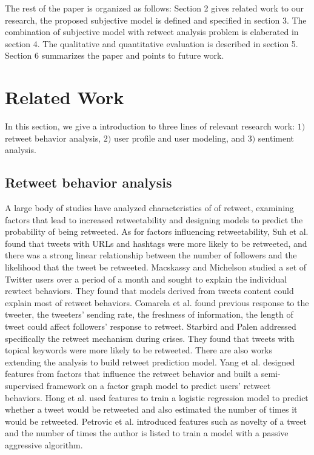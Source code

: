 \documentclass{acm_proc_article-sp}
\begin{document}
The rest of the paper is organized as follows: Section 2 gives related work to our research, the proposed subjective model is defined and specified in section 3. The combination of subjective model with retweet analysis problem is elaberated in section 4. The qualitative and quantitative evaluation is 
described in section 5. Section 6 summarizes the paper and points to future work.
\section{Related Work}
In this section, we give a introduction to three lines of relevant research work: $ 1) $ retweet behavior analysis, $ 2) $ user profile and user modeling, and $  3)$ sentiment analysis. 
\subsection{Retweet behavior analysis}
A large body of studies have analyzed characteristics of of retweet, examining factors that lead to increased retweetability and designing models to predict the probability of being retweeted. 
As for factors influencing retweetability, Suh et al.\cite{Suh2010} found that tweets with URLs and hashtags were more likely to be retweeted, and there was a strong linear relationship between the number of followers and the likelihood that the tweet be retweeted. 
Macskassy and Michelson\cite{conf/icwsm/MacskassyM11} studied a set of Twitter users over a period of a month and sought to explain the individual rewteet behaviors.
They found that models derived from tweets content could explain most of retweet behaviors.
Comarela et al.\cite{Comarela:2012UFA} found previous response to the tweeter, the tweeters’ sending rate, the freshness of information, the length of tweet could affect followers’ response to retweet. Starbird and Palen\cite{Starbird:2012RRI} addressed specifically the retweet mechanism during crises. 
They found that tweets with topical keywords were more likely to be retweeted. 
There are also works extending the analysis to build retweet prediction model. 
Yang et al.\cite{conf/cikm/YangGCTLZS10} designed features from factors that influence the retweet behavior and built a semi-supervised framework on a factor graph model to predict users’ retweet behaviors. 
Hong et al.\cite{ericmedvet:hong2011} used features to train a logistic regression model to predict whether a tweet would be retweeted and also estimated the number of times it would be retweeted. 
Petrovic et al.\cite{Osborne_Lavrenko_2011} introduced features such as novelty of a tweet and the number of times the author is listed to train a model with a passive aggressive algorithm. 
\end{document}
